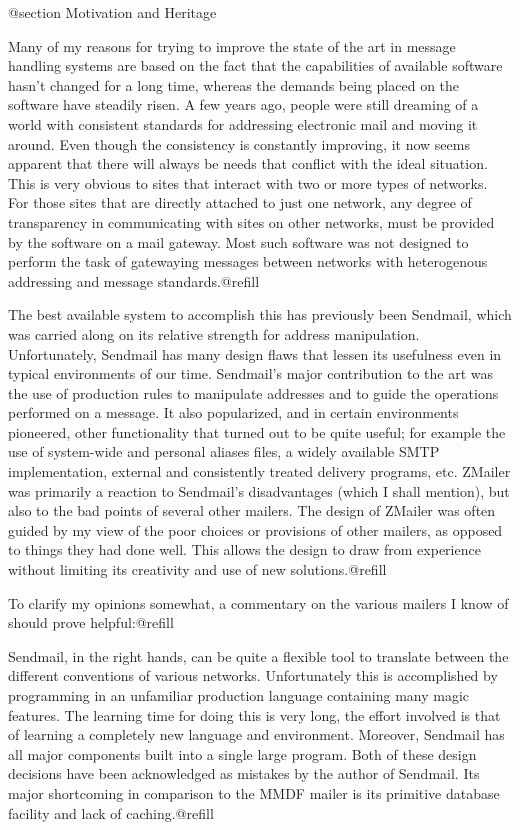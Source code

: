 @section Motivation and Heritage

Many of my reasons for trying to improve the state of the art in message
handling systems are based on the fact that the capabilities of available
software hasn't changed for a long time, whereas the demands being placed on the
software have steadily risen. A few years ago, people were still dreaming
of a world with consistent standards for addressing electronic mail and
moving it around. Even though the consistency is constantly improving, it
now seems apparent that there will always be needs that conflict with the
ideal situation. This is very obvious to sites that interact with two or
more types of networks. For those sites that are directly attached to just
one network, any degree of transparency in communicating with sites on other
networks, must be provided by the software on a mail gateway. Most such
software was not designed to perform the task of gatewaying messages between
networks with heterogenous addressing and message standards.@refill

The best available system to accomplish this has previously been Sendmail,
which was carried along on its relative strength for address manipulation.
Unfortunately, Sendmail has many design flaws that lessen its usefulness
even in typical environments of our time. Sendmail's major contribution to
the art was the use of production rules to manipulate addresses and to guide
the operations performed on a message. It also popularized, and in certain
environments pioneered, other functionality that turned out to be quite useful;
for example the use of system-wide and personal aliases files, a widely
available SMTP implementation, external and consistently treated delivery
programs, etc.  ZMailer was primarily a reaction to Sendmail's disadvantages
(which I shall mention), but also to the bad points of several other mailers.
The design of ZMailer was often guided by my view of the poor choices or
provisions of other mailers, as opposed to things they had done well. This
allows the design to draw from experience without limiting its creativity
and use of new solutions.@refill

To clarify my opinions somewhat, a commentary on the various mailers I
know of should prove helpful:@refill

Sendmail, in the right hands, can be quite a flexible tool to translate
between the different conventions of various networks.  Unfortunately
this is accomplished by programming in an unfamiliar production language
containing many magic features.  The learning time for doing this is very long,
the effort involved is that of learning a completely new language and
environment. Moreover, Sendmail has all major components built into a
single large program. Both of these design decisions have been acknowledged
as mistakes by the author of Sendmail.  Its major shortcoming in comparison
to the MMDF mailer is its primitive database facility and lack of
caching.@refill

